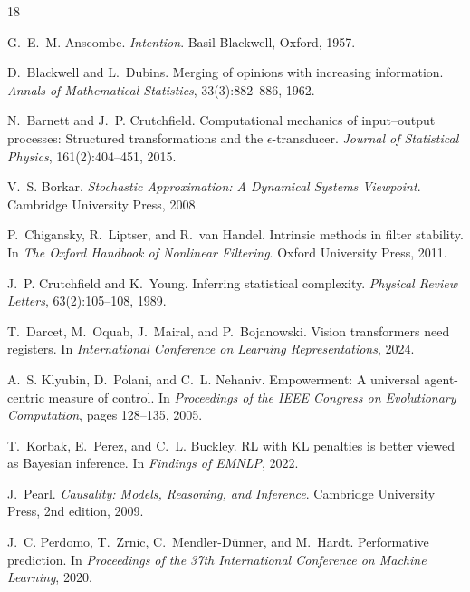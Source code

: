 \documentclass[11pt]{article}
\begin{document}
\begin{thebibliography}{18}

G.~E.~M. Anscombe.
\newblock \emph{Intention}.
\newblock Basil Blackwell, Oxford, 1957.

D.~Blackwell and L.~Dubins.
\newblock Merging of opinions with increasing information.
\newblock \emph{Annals of Mathematical Statistics}, 33(3):882--886, 1962.

N.~Barnett and J.~P. Crutchfield.
\newblock Computational mechanics of input--output processes: Structured transformations and the $\epsilon$-transducer.
\newblock \emph{Journal of Statistical Physics}, 161(2):404--451, 2015.

V.~S. Borkar.
\newblock \emph{Stochastic Approximation: A Dynamical Systems Viewpoint}.
\newblock Cambridge University Press, 2008.

P.~Chigansky, R.~Liptser, and R.~van Handel.
\newblock Intrinsic methods in filter stability.
\newblock In \emph{The Oxford Handbook of Nonlinear Filtering}. Oxford University Press, 2011.

J.~P. Crutchfield and K.~Young.
\newblock Inferring statistical complexity.
\newblock \emph{Physical Review Letters}, 63(2):105--108, 1989.

T.~Darcet, M.~Oquab, J.~Mairal, and P.~Bojanowski.
\newblock Vision transformers need registers.
\newblock In \emph{International Conference on Learning Representations}, 2024.

A.~S. Klyubin, D.~Polani, and C.~L. Nehaniv.
\newblock Empowerment: A universal agent-centric measure of control.
\newblock In \emph{Proceedings of the IEEE Congress on Evolutionary Computation}, pages 128--135, 2005.

T.~Korbak, E.~Perez, and C.~L. Buckley.
\newblock RL with KL penalties is better viewed as Bayesian inference.
\newblock In \emph{Findings of EMNLP}, 2022.

J.~Pearl.
\newblock \emph{Causality: Models, Reasoning, and Inference}.
\newblock Cambridge University Press, 2nd edition, 2009.

J.~C. Perdomo, T.~Zrnic, C.~Mendler-D\"unner, and M.~Hardt.
\newblock Performative prediction.
\newblock In \emph{Proceedings of the 37th International Conference on Machine Learning}, 2020.


\end{thebibliography}
\end{document}
